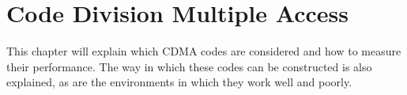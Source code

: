 
\chapter{Code Division Multiple Access}
\label{chp:cdma}


This chapter will explain which CDMA codes are considered and how to measure their performance.
The way in which these codes can be constructed is also explained, as are the environments in which they work well and poorly. 









